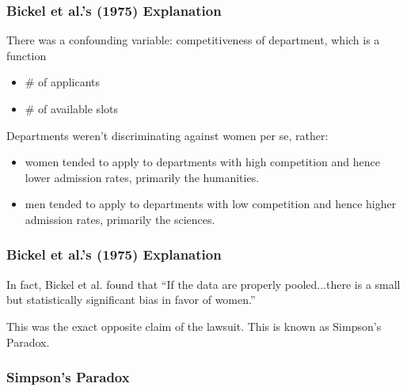 \documentclass[handout]{beamer}
\newcommand{\blue}[1]{\textcolor{blue2}{#1}}
\begin{document}
\begin{frame}
\frametitle{Bickel et al.'s (1975) Explanation}

There was a confounding variable: \blue{competitiveness of department}, which is a function
\begin{itemize}
\item \# of applicants
\item \# of available slots
\end{itemize}

\vskip 0.5cm

\pause Departments weren't discriminating against women per se, rather:
\begin{itemize}
\pause \item women tended to apply to departments with high competition and hence lower admission rates, primarily the humanities.
\pause \item men tended to apply to departments with low competition and hence higher admission rates, primarily the sciences.
\end{itemize}

\end{frame}


\begin{frame}
\frametitle{Bickel et al.'s (1975) Explanation}

In fact, Bickel et al. found that ``If the data are properly pooled...there is a small but statistically significant bias in favor of women.''

\vskip 0.5cm

\pause This was the exact opposite claim of the lawsuit.  This is known as \blue{Simpson's Paradox}.  

\end{frame}



\begin{frame}
\frametitle{Simpson's Paradox}

%
%

\end{frame}
\end{document}
